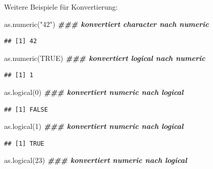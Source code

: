 \documentclass[
]{book}
\newenvironment{Shaded}{\begin{snugshade}}{\end{snugshade}}
\newcommand{\ConstantTok}[1]{\textcolor[rgb]{0.00,0.00,0.00}{#1}}
\newcommand{\DecValTok}[1]{\textcolor[rgb]{0.00,0.00,0.81}{#1}}
\newcommand{\DocumentationTok}[1]{\textcolor[rgb]{0.56,0.35,0.01}{\textbf{\textit{#1}}}}
\newcommand{\FunctionTok}[1]{\textcolor[rgb]{0.00,0.00,0.00}{#1}}
\newcommand{\NormalTok}[1]{#1}
\newcommand{\StringTok}[1]{\textcolor[rgb]{0.31,0.60,0.02}{#1}}
\begin{document}
Weitere Beispiele für Konvertierung:

\begin{Shaded}
\begin{Highlighting}[]
\FunctionTok{as.numeric}\NormalTok{(}\StringTok{"42"}\NormalTok{) }\DocumentationTok{\#\#\# konvertiert character nach numeric}
\end{Highlighting}
\end{Shaded}

\begin{verbatim}
## [1] 42
\end{verbatim}

\begin{Shaded}
\begin{Highlighting}[]
\FunctionTok{as.numeric}\NormalTok{(}\ConstantTok{TRUE}\NormalTok{) }\DocumentationTok{\#\#\# konvertiert logical nach numeric}
\end{Highlighting}
\end{Shaded}

\begin{verbatim}
## [1] 1
\end{verbatim}

\begin{Shaded}
\begin{Highlighting}[]
\FunctionTok{as.logical}\NormalTok{(}\DecValTok{0}\NormalTok{)  }\DocumentationTok{\#\#\# konvertiert numeric nach logical}
\end{Highlighting}
\end{Shaded}

\begin{verbatim}
## [1] FALSE
\end{verbatim}

\begin{Shaded}
\begin{Highlighting}[]
\FunctionTok{as.logical}\NormalTok{(}\DecValTok{1}\NormalTok{)  }\DocumentationTok{\#\#\# konvertiert numeric nach logical }
\end{Highlighting}
\end{Shaded}

\begin{verbatim}
## [1] TRUE
\end{verbatim}

\begin{Shaded}
\begin{Highlighting}[]
\FunctionTok{as.logical}\NormalTok{(}\DecValTok{23}\NormalTok{)  }\DocumentationTok{\#\#\# konvertiert numeric nach logical}
\end{Highlighting}
\end{Shaded}
\end{document}
